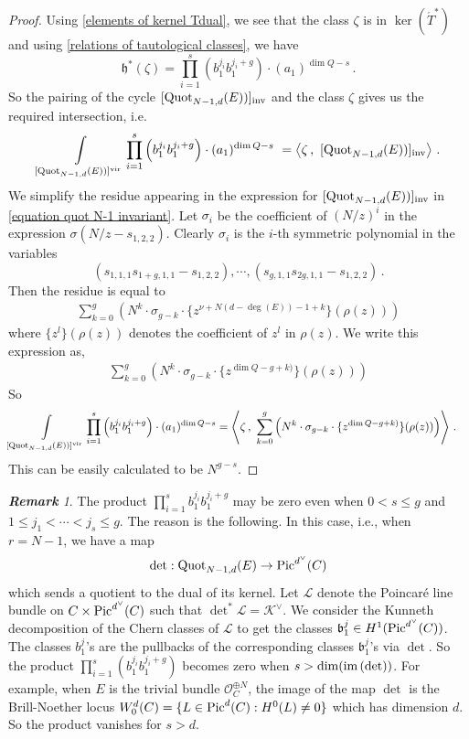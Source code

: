 \documentclass[11pt]{amsart}
\theoremstyle{remark}
\newtheorem{remark}[theorem]{\bf Remark}
\renewcommand{\O}{\mathcal{O}}
\newcommand{\mf}[1]{\mathfrak{#1}}
\newcommand{\K}{\mathcal{K}}
\newcommand{\im}{\textnormal{im}\,}
\newcommand{\quot}[0]{\textnormal{Quot}}
\newcommand{\vir}[0]{\textnormal{vir}}
\newcommand{\inv}[0]{\textnormal{inv}}
\renewcommand{\L}[0]{\mathcal L}
\newcommand{\Pic}{\textnormal{Pic}}
\numberwithin{theorem}{section}
\begin{document}
\begin{proof}
    Using \eqref{elements of kernel Tdual}, we see that the class
    $\zeta$ is in $\ker(\acute{T}^*)$
    and using \eqref{relations of tautological classes},
    we have 
    $$\mf h^*(\zeta) = \prod_{i=1}^s \left(b_1^{j_i}b_1^{j_i+g}\right) \cdot 
        (a_1)^{\dim Q-s}\,.$$
    So the pairing of the cycle $[\quot_{N-1,d}(E))]_\inv$ and the class $\zeta$ gives us the required intersection, i.e.
    \begin{align*}
        \int\limits_{[\quot_{N-1,d}(E))]^\vir} 
        \prod_{i=1}^s  \left(b_1^{j_i}  b_1^{j_i+g}\right) \cdot (a_1)^{\dim Q-s} \
        = \left\langle  \zeta \,, \ [\quot_{N-1,d}(E))]_\inv \right\rangle\,.
    \end{align*} 
We simplify the residue appearing in the expression for 
$[\quot_{N-1,d}(E))]_\inv$ in
\eqref{equation quot N-1 invariant}. 
Let $\sigma_i$ be the coefficient of $(N/z)^i$ 
in the expression $\sigma(N/z-s_{1,2,2})$.
Clearly $\sigma_i$ is the
$i$-th symmetric polynomial in the variables
$$(s_{1,1,1}s_{1+g,1,1}-s_{1,2,2}), \cdots, (s_{g,1,1}s_{2g,1,1}-s_{1,2,2})\,.$$
Then the residue is equal to
\begin{align*}
    \sum_{k=0}^g \left( N^k \cdot \sigma_{g-k} \cdot \{z^{\nu+N(d-\deg(E))-1+k}\}(\rho(z)) \right)
\end{align*}
where $\{z^l\}(\rho(z))$ denotes the coefficient of $z^l$ in $\rho(z)$.
We write this expression as,
\begin{align*}
    \sum_{k=0}^g \left( N^k \cdot \sigma_{g-k} \cdot \{z^{\dim Q-g+k)}\}(\rho(z)) \right)
\end{align*}
So 
\begin{align*}
        \int\limits_{[\quot_{N-1,d}(E))]^\vir} 
        \prod_{i=1}^s & \left(b_1^{j_i}  b_1^{j_i+g}\right) \cdot (a_1)^{\dim Q-s}
         = \left\langle  \zeta \,, \ \sum_{k=0}^g \left( N^k \cdot \sigma_{g-k} \cdot \{z^{\dim Q-g+k)}\}(\rho(z)) \right) \right\rangle \,.
    \end{align*} 
This can be easily calculated to be $N^{g-s}$.
\end{proof}

\begin{remark}
    The product $\prod_{i=1}^s b_1^{j_i}b_1^{j_i+g}$ may be zero even when
    $0 < s \leqslant g$ and $1 \leqslant j_1 < \cdots < j_s \leqslant g$.
    The reason is the following.
    In this case, i.e., when $r=N-1$,
    we have a map $$\det: \quot_{N-1,d}(E) \to \Pic^{d^\vee}(C)$$
    which sends a quotient to the dual of its kernel.
    Let $\L$ denote the Poincaré line bundle on $C \times \Pic^{d^\vee}(C)$ such that $\det^*\L = \K^\vee$.
    We consider the Kunneth decomposition of the Chern classes of $\L$ to get the classes 
    $\mathfrak{b}_1^j \in H^1(\Pic^{d^\vee}(C))$. 
    The classes $b_1^j$'s
    are the pullbacks of the corresponding classes $\mathfrak{b}_1^j$'s via $\det$.
    So the product $\prod_{i=1}^s (b_1^{j_i}b_1^{j_i+g})$ becomes zero when $s> \dim (\im(\det))$.
    For example, when $E$ is the trivial bundle $\O_C^{\oplus N}$, the image of the map $\det$ is the Brill-Noether locus
    $W_0^d(C) = \{L \in \Pic^{d}(C) : H^0(L)\neq 0\}$ which has dimension $d$. So the product vanishes for $s>d$.
\end{remark}
\end{document}
